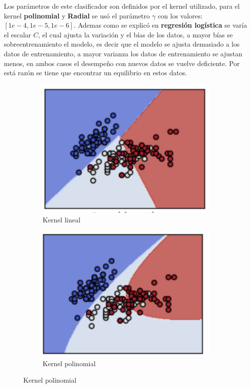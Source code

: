 Los parámetros de este clasificador son definidos por el kernel utilizado, para el kernel \textbf{polinomial} y \textbf{Radial} se usó el parámetro $\gamma$ con los valores: $[1e-4, 1e-5, 1e-6]$. Ademas como se explicó en \textbf{regresión logística} se varía el escalar $C$, el cual ajusta la variación y el bías de los datos, a mayor bías se sobre\-entrenamiento el modelo, es decir que el modelo se ajusta demasiado a los datos de entrenamiento, a mayor varianza los datos de entrenamiento se ajustan menos, en ambos casos el desempeño con nuevos datos se vuelve deficiente. Por está razón se tiene que encontrar un equilibrio en estos datos.\\



\begin{figure}[H]
\centering
	\begin{subfigure}{.5\textwidth}
	\centering
	\includegraphics[scale=0.8]{imagenes/capitulo5/Entrenamiento/klineal.png}
	\caption{Kernel lineal}
	\label{fig:cp5:klineal}
	\end{subfigure}%
	\begin{subfigure}{.5\textwidth}
	\centering
	\includegraphics[scale=0.8]{imagenes/capitulo5/Entrenamiento/kpoli.png}
	\caption{Kernel polinomial}
	\label{fig:cp5:kpoli}
	\end{subfigure}%
\end{figure}

